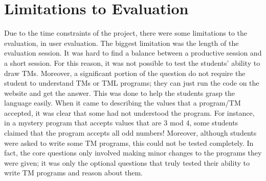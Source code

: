 \section{Limitations to Evaluation}
Due to the time constraints of the project, there were some limitations to the evaluation, in user evaluation. The biggest limitation was the length of the evaluation session. It was hard to find a balance between a productive session and a short session. 
For this reason, it was not possible to test the students' ability to draw TMs. Moreover, a significant portion of the question do not require the student to understand TMs or TML programs; they can just run the code on the website and get the answer. This was done to help the students grasp the language easily. When it came to describing the values that a program/TM accepted, it was clear that some had not understood the program. For instance, in a mystery program that accepts values that are 3 mod 4, some students claimed that the program accepts all odd numbers!
Moreover, although students were asked to write some TM programs, this could not be tested completely. In fact, the core questions only involved making minor changes to the programs they were given; it was only the optional questions that truly tested their ability to write TM programs and reason about them. 


